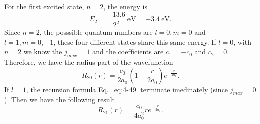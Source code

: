 For the first excited state, $n=2$, the energy is
\begin{equation}
  \label{eq:4-54}
  E_2 = \frac{-13.6}{2^{2}} ~ \text{eV} = -3.4 ~ \text{eV}.
\end{equation}
Since $n=2$, the posssible quantum numbers are $l=0, m=0$ and $l=1, m=0, \pm 1$, these four different states share this same energy.
If $l=0$, with $n=2$ we know the $j_{max}=1$ and the coefficients are $c_1 = - c_0$ and $c_{2}=0$.
Therefore, we have the radius part of the wavefunction
\begin{equation}
  \label{eq:4-55}
  R_{20} \left( r \right) = \frac{c_{0}}{2a_{0}} \left( 1 - \frac{r}{2a_{0}} \right) e^{- \frac{r}{2a_{0}}} .
\end{equation}
If $l=1$, the recursion formula Eq.~\eqref{eq:4-49} terminate imedinately (since $j_{max}=0$).
Then we have the following result
\begin{equation}
  \label{eq:4-56}
  R_{21} \left( r \right) = \frac{c_{0}}{4 a_{0}^{2}} r e^{- \frac{r}{2a_{0}}} .
\end{equation}

